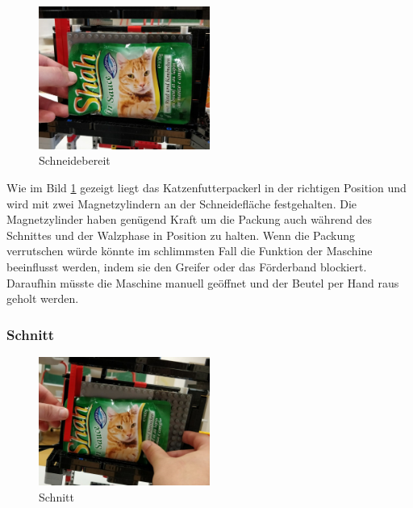 \begin{figure}
\vspace{-30pt}
  \begin{center}
    \includegraphics[width=0.50\textwidth]{Bilder/Ablauf_1_png/Schneidebereit}
  \end{center}
  \caption{Schneidebereit}
  \label{Schneidebereit}
  \vspace{-10pt}
\end{figure}

Wie im Bild \ref{Schneidebereit} gezeigt liegt das Katzenfutterpackerl in der richtigen Position und wird mit zwei Magnetzylindern an der Schneidefläche festgehalten. Die Magnetzylinder haben genügend Kraft um die Packung auch während des Schnittes und der Walzphase in Position zu halten. Wenn die Packung verrutschen würde könnte im schlimmsten Fall die Funktion der Maschine beeinflusst werden, indem sie den Greifer oder das Förderband blockiert. Daraufhin müsste die Maschine manuell geöffnet und der Beutel per Hand raus geholt werden. \newpage
\subsubsection{Schnitt}

\begin{figure}
\vspace{-30pt}
  \begin{center}
    \includegraphics[width=0.50\textwidth]{Bilder/Ablauf_1_png/Schnitt}
  \end{center}
  \caption{Schnitt}
  \label{Schnitt}
  \vspace{-10pt}
\end{figure}

